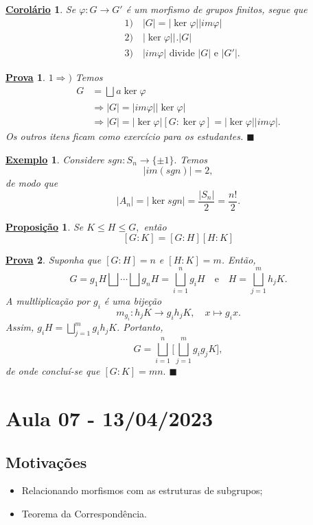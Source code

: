 \documentclass{article}
\newtheorem*{prop*}{\underline{Proposi\c c\~ao}}
\newtheorem*{crl*}{\underline{Corol\'ario}}
\newtheorem{example*}{\underline{Exemplo}}
\newtheorem*{proof*}{\underline{Prova}}
\renewcommand\qedsymbol{$\blacksquare$}
\begin{document}
\begin{crl*}
  Se $\varphi:G\rightarrow G'$ \'e um morfismo de grupos finitos, segue que 
 \begin{align*}
   &1)\quad |G| = |\ker{\varphi}||im\varphi|\\
   &2)\quad |\ker{\varphi}| \biggl|_{}^{}\biggr. |G|\\
   &3)\quad |im\varphi|\text{ divide } |G|\text{ e }|G'|.
 \end{align*}
\end{crl*}
\begin{proof*}
  $1\Rightarrow)$ Temos 
 \begin{align*}
   G &= \bigsqcup_{}^{}{a\ker{\varphi}}\\
     & \Rightarrow |G| = |im\varphi||\ker{\varphi}|\\
     & \Rightarrow |G| = |\ker\varphi|[G:\ker{\varphi}] = |\ker{\varphi}||im\varphi|.
 \end{align*}
  Os outros itens ficam como exerc\'icio para os estudantes. \qedsymbol
\end{proof*}
\begin{example*}
  Considere $sgn:S_{n}\rightarrow \{\pm 1\}.$ Temos 
    $$
      |im(sgn)| = 2,
    $$
    de modo que 
    $$
    |A_{n}| = |\ker{sgn}| = \frac{|S_{n}|}{2} = \frac{n!}{2}.
    $$
\end{example*}
\begin{prop*}
  Se $K\leq{H}\leq{G},$ ent\~ao 
    $$
    [G:K] = [G:H][H:K] 
    $$ 
\end{prop*}
\begin{proof*}
  Suponha que $[G:H] = n$ e $[H:K]=m$. Ent\~ao, 
    $$
    G = g_{1}H\bigsqcup_{}^{}{\cdots}\bigsqcup_{}^{}{g_{n}H} = \bigsqcup_{i=1}^{n}{g_{i}H}\quad\text{e}\quad H = \bigsqcup_{j=1}^{m}{h_{j}K}.
    $$
  A multliplica\c c\~ao por $g_{i}$ \'e uma bije\c c\~ao 
    $$
      m_{g_{i}}:h_{j}K\rightarrow g_{i}h_{j}K,\quad x\mapsto g_{i}x.
    $$
  Assim, $g_{i}H = \bigsqcup_{j=1}^{m}{g_{i}h_{j}K}.$ Portanto, 
    $$
    G = \bigsqcup_{i=1}^{n}{\biggl[\bigsqcup_{j=1}^{m}{g_{i}g_{j}K}\biggr]},
    $$
    de onde conclu\'i-se que $[G:K]=mn.$ \qedsymbol
\end{proof*}
\newpage

\section{Aula 07 - 13/04/2023}
\subsection{Motiva\c c\~oes}
\begin{itemize}
  \item Relacionando morfismos com as estruturas de subgrupos;
  \item Teorema da Correspond\^encia.
\end{itemize}
\end{document}
